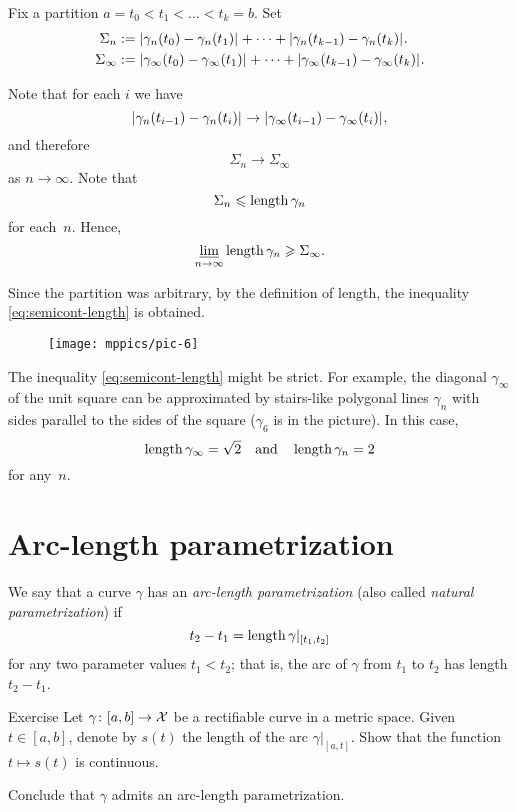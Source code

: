 Fix a partition $a=t_0<t_1<\dots<t_k=b$.
Set 
\begin{align*}\Sigma_n
&\df
\dist{\gamma_n(t_0)}{\gamma_n(t_1)}{}
+\dots+
\dist{\gamma_n(t_{k-1})}{\gamma_n(t_k)}{}.
\\
\Sigma_\infty
&\df
\dist{\gamma_\infty(t_0)}{\gamma_\infty(t_1)}{}
+\dots+
\dist{\gamma_\infty(t_{k-1})}{\gamma_\infty(t_k)}{}.
\end{align*}

Note that for each $i$ we have 
\[\dist{\gamma_n(t_{i-1})}{\gamma_n(t_i)}{}
\to
\dist{\gamma_\infty(t_{i-1})}{\gamma_\infty(t_i)}{},\]
and therefore
\[\Sigma_n\to \Sigma_\infty\] 
as $n\to\infty$.
Note that 
\[\Sigma_n\leqslant\mathop{\rm length}\nolimits\gamma_n\]
for each~$n$.
Hence,
$$\varliminf_{n\to\infty} \mathop{\rm length}\nolimits\gamma_n \geqslant \Sigma_\infty.$$

  
Since the partition was arbitrary, by the definition of length, the inequality  \ref{eq:semicont-length} is obtained.
\qeds


\begin{wrapfigure}{o}{20 mm}
\vskip3mm
\centering
\texttt{[image: mppics/pic-6]}
\end{wrapfigure}


The inequality \ref{eq:semicont-length} might be strict.
For example, the diagonal $\gamma_\infty$ of the unit square 
can be approximated by stairs-like polygonal lines $\gamma_n$
with sides parallel to the sides of the square ($\gamma_6$ is in the picture).
In this case,
\[\mathop{\rm length}\nolimits\gamma_\infty=\sqrt{2}\quad
\text{and}\quad \mathop{\rm length}\nolimits\gamma_n=2\]
for any~$n$.
  
\section{Arc-length parametrization}

We say that a curve $\gamma$ has an \emph{arc-length parametrization} (also called \emph{natural parametrization})
if 
\[t_2-t_1=\mathop{\rm length}\nolimits \gamma|_{[t_1,t_2]}\]
for any two parameter values $t_1<t_2$;
that is, the arc of $\gamma$ from $t_1$ to $t_2$ has length $t_2-t_1$.

\begin{thm}{Exercise}\label{ex:cont-length}
Let  $\gamma\colon[a,b]\to \mathcal{X}$ be a rectifiable curve in a metric space.
Given $t\in [a,b]$, denote by $s(t)$ the length of the arc $\gamma|_{[a,t]}$.
Show that the function $t\mapsto s(t)$ is continuous.

Conclude that $\gamma$ admits an arc-length parametrization.
\end{thm}

